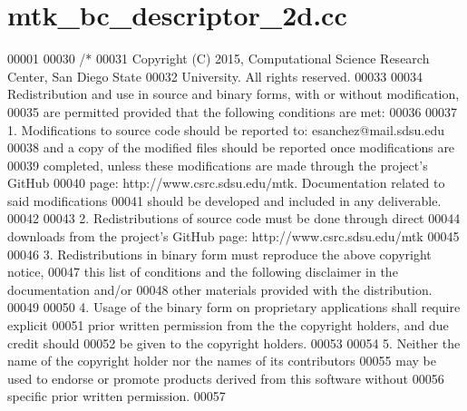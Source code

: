 \hypertarget{mtk__bc__descriptor__2d_8cc_source}{\section{mtk\+\_\+bc\+\_\+descriptor\+\_\+2d.\+cc}
\label{mtk__bc__descriptor__2d_8cc_source}
}

\begin{DoxyCode}
00001 
00030 \textcolor{comment}{/*}
00031 \textcolor{comment}{Copyright (C) 2015, Computational Science Research Center, San Diego State}
00032 \textcolor{comment}{University. All rights reserved.}
00033 \textcolor{comment}{}
00034 \textcolor{comment}{Redistribution and use in source and binary forms, with or without modification,}
00035 \textcolor{comment}{are permitted provided that the following conditions are met:}
00036 \textcolor{comment}{}
00037 \textcolor{comment}{1. Modifications to source code should be reported to: esanchez@mail.sdsu.edu}
00038 \textcolor{comment}{and a copy of the modified files should be reported once modifications are}
00039 \textcolor{comment}{completed, unless these modifications are made through the project's GitHub}
00040 \textcolor{comment}{page: http://www.csrc.sdsu.edu/mtk. Documentation related to said modifications}
00041 \textcolor{comment}{should be developed and included in any deliverable.}
00042 \textcolor{comment}{}
00043 \textcolor{comment}{2. Redistributions of source code must be done through direct}
00044 \textcolor{comment}{downloads from the project's GitHub page: http://www.csrc.sdsu.edu/mtk}
00045 \textcolor{comment}{}
00046 \textcolor{comment}{3. Redistributions in binary form must reproduce the above copyright notice,}
00047 \textcolor{comment}{this list of conditions and the following disclaimer in the documentation and/or}
00048 \textcolor{comment}{other materials provided with the distribution.}
00049 \textcolor{comment}{}
00050 \textcolor{comment}{4. Usage of the binary form on proprietary applications shall require explicit}
00051 \textcolor{comment}{prior written permission from the the copyright holders, and due credit should}
00052 \textcolor{comment}{be given to the copyright holders.}
00053 \textcolor{comment}{}
00054 \textcolor{comment}{5. Neither the name of the copyright holder nor the names of its contributors}
00055 \textcolor{comment}{may be used to endorse or promote products derived from this software without}
00056 \textcolor{comment}{specific prior written permission.}
00057 \textcolor{comment}{}

\end{DoxyCode}
